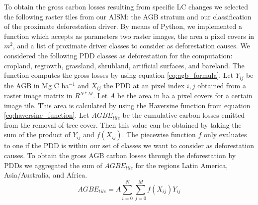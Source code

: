 		To obtain the gross carbon losses resulting from specific \ac{LC} changes we selected the following raster tiles from our \ac{AISM}: the \ac{AGB} stratum and our classification of the proximate deforestation driver. By means of Python, we implemented a function which accepts as parameters two raster images, the area a pixel covers in $m^2$, and a list of proximate driver classes to consider as deforestation causes. We considered the following \ac{PDD} classes as deforestation for the computation: cropland, regrowth, grassland, shrubland, artificial surfaces, and bareland. The function computes the gross losses by using  equation \ref{eq:agb_formula}. Let $Y_{ij}$ be the \ac{AGB} in Mg C ha$^{-1}$ and $X_{ij}$ the \ac{PDD} at an pixel index $i,j$ obtained from a raster image matrix in $R^{N*M}$. Let $A$ be the area in ha a pixel covers for a certain image tile. This area is calculated by using the Haversine function from equation \ref{eq:haversine_function}. Let $AGBE_{tile}$ be the cumulative carbon losses emitted from the removal of tree cover. Then this value can be obtained by taking the sum of the product of $Y_{ij}$ and $f(X_{ij})$. The piecewise function $f$ only evaluates to one if the \ac{PDD} is within our set of classes we want to consider as deforestation causes. To obtain the gross \ac{AGB} carbon losses through the deforestation by \acp{PDD} we aggregated the sum of $AGBE_{tile}$ for the regions Latin America, Asia/Australia, and Africa.
		\begin{equation}
		\label{eq:agb_formula}
			AGBE_{tile} = A\displaystyle\sum_{i=0}^{N}\displaystyle\sum_{j=0}^{M} f(X_{ij})Y_{ij}
		\end{equation}
